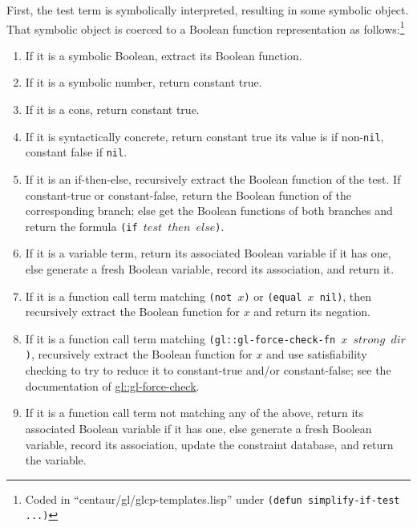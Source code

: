 \documentclass[submission,copyright,creativecommons]{eptcs}
\newcommand*{\var}[1]{\mathit{#1}}
\begin{document}
First, the test term is symbolically interpreted, resulting in some
symbolic object.  That symbolic object is coerced to a Boolean
function representation as follows:\footnote{Coded in
  ``centaur/gl/glcp-templates.lisp'' under \texttt{(defun
    simplify-if-test ...)}}
\begin{enumerate}
\item If it is a symbolic Boolean, extract its Boolean function.
\item If it is a symbolic number, return constant true.
\item If it is a cons, return constant true.
\item If it is syntactically concrete, return constant true its value is if non-\texttt{nil}, constant false if \texttt{nil}.
\item If it is an if-then-else, recursively extract the Boolean
  function of the test.  If constant-true or constant-false, return
  the Boolean function of the corresponding branch; else get the
  Boolean functions of both branches and return the
  formula \texttt{(if $\var{test}$ $\var{then}$ $\var{else}$)}.
\item If it is a variable term, return its associated Boolean variable
  if it has one, else generate a fresh Boolean variable, record its
  association, and return it.
\item If it is a function call term matching \texttt{(not $x$)} or
  \texttt{(equal $x$ nil)}, then recursively extract the Boolean
  function for $x$ and return its negation.
\item If it is a function call term matching
  \texttt{(gl::gl-force-check-fn $x$ $\var{strong}$ $\var{dir}$)},
  recursively extract the Boolean function for $x$ and use
  satisfiability checking to try to reduce it to constant-true and/or
  constant-false; see the documentation of
  \href{http://www.cs.utexas.edu/users/moore/acl2/manuals/current/manual/?topic=GL____GL-FORCE-CHECK}{\underline{gl::gl-force-check}}.
\item If it is a function call term not matching any of the above,
  return its associated Boolean variable if it has one, else generate
  a fresh Boolean variable, record its association, update the
  constraint database, and return the variable.
\end{enumerate}
\end{document}
